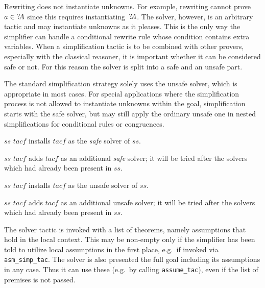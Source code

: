 Rewriting does not instantiate unknowns.  For example, rewriting
cannot prove $a\in {?\!A}$ since this requires
instantiating~${?\!A}$.  The solver, however, is an arbitrary tactic
and may instantiate unknowns as it pleases.  This is the only way the
simplifier can handle a conditional rewrite rule whose condition
contains extra variables.  When a simplification tactic is to be
combined with other provers, especially with the classical reasoner,
it is important whether it can be considered safe or not.  For this
reason the solver is split into a safe and an unsafe part.

The standard simplification strategy solely uses the unsafe solver,
which is appropriate in most cases.  For special applications where
the simplification process is not allowed to instantiate unknowns
within the goal, simplification starts with the safe solver, but may
still apply the ordinary unsafe one in nested simplifications for
conditional rules or congruences.

\begin{ttdescription}
  
\item[$ss$ \ttindexbold{setSSolver} $tacf$] installs $tacf$ as the
  \emph{safe} solver of $ss$.
  
\item[$ss$ \ttindexbold{addSSolver} $tacf$] adds $tacf$ as an
  additional \emph{safe} solver; it will be tried after the solvers
  which had already been present in $ss$.
  
\item[$ss$ \ttindexbold{setSolver} $tacf$] installs $tacf$ as the
  unsafe solver of $ss$.
  
\item[$ss$ \ttindexbold{addSolver} $tacf$] adds $tacf$ as an
  additional unsafe solver; it will be tried after the solvers which
  had already been present in $ss$.

\end{ttdescription}

\medskip

 The solver tactic is invoked
with a list of theorems, namely assumptions that hold in the local
context.  This may be non-empty only if the simplifier has been told
to utilize local assumptions in the first place, e.g.\ if invoked via
\texttt{asm_simp_tac}.  The solver is also presented the full goal
including its assumptions in any case.  Thus it can use these (e.g.\ 
by calling \texttt{assume_tac}), even if the list of premises is not
passed.

